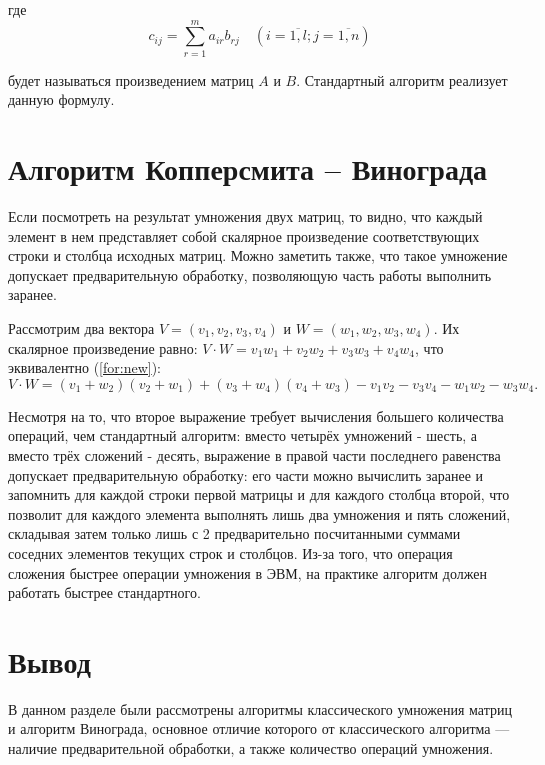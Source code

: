 \documentclass[12pt]{report}
\begin{document}
где
\begin{equation}
	\label{eq:M}
	c_{ij} =
		\sum_{r=1}^{m} a_{ir}b_{rj} \quad (i=\overline{1,l}; j=\overline{1,n})
\end{equation}

будет называться произведением матриц $A$ и $B$.
Стандартный алгоритм реализует данную формулу.

\section{Алгоритм Копперсмита -- Винограда}

Если посмотреть на результат умножения двух матриц, то видно, что каждый элемент в нем представляет собой скалярное произведение соответствующих строки и столбца исходных матриц.
Можно заметить также, что такое умножение допускает предварительную обработку, позволяющую часть работы выполнить заранее.

Рассмотрим два вектора $V = (v_1, v_2, v_3, v_4)$ и $W = (w_1, w_2, w_3, w_4)$.
Их скалярное произведение равно: $V \cdot W = v_1w_1 + v_2w_2 + v_3w_3 + v_4w_4$, что эквивалентно (\ref{for:new}):
\begin{equation}
	\label{for:new}
		V \cdot W = (v_1 + w_2)(v_2 + w_1) + (v_3 + w_4)(v_4 + w_3) - v_1v_2 - v_3v_4 - w_1w_2 - w_3w_4.
\end{equation}

Несмотря на то, что второе выражение требует вычисления большего количества операций, чем стандартный алгоритм: вместо четырёх умножений - шесть, а вместо трёх сложений - десять, выражение в правой части последнего равенства допускает предварительную обработку: его части можно вычислить заранее и запомнить для каждой строки первой матрицы и для каждого столбца второй, что позволит для каждого элемента выполнять лишь два умножения и пять сложений, складывая затем только лишь с 2 предварительно посчитанными суммами соседних элементов текущих строк и столбцов.
Из-за того, что операция сложения быстрее операции умножения в ЭВМ, на практике алгоритм должен работать быстрее стандартного.

\section{Вывод}
	В данном разделе были рассмотрены алгоритмы классического умножения матриц и алгоритм Винограда, основное отличие которого от классического алгоритма — наличие предварительной обработки, а также количество операций умножения. 
\clearpage
\end{document}
